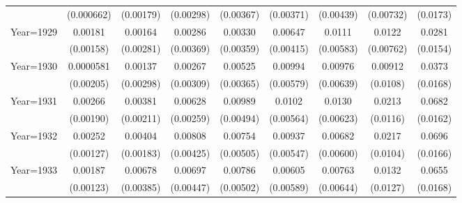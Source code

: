 \begin{table}[htbp]
\begin{tabular}{l*{8}{c}}
                    &  (0.000662)         &   (0.00179)         &   (0.00298)         &   (0.00367)         &   (0.00371)         &   (0.00439)         &   (0.00732)         &    (0.0173)         \\
[1em]
Year=1929           &     0.00181         &     0.00164         &     0.00286         &     0.00330         &     0.00647         &      0.0111\sym{*}  &      0.0122         &      0.0281\sym{*}  \\
                    &   (0.00158)         &   (0.00281)         &   (0.00369)         &   (0.00359)         &   (0.00415)         &   (0.00583)         &   (0.00762)         &    (0.0154)         \\
[1em]
Year=1930           &   0.0000581         &     0.00137         &     0.00267         &     0.00525         &     0.00994\sym{*}  &     0.00976         &     0.00912         &      0.0373\sym{**} \\
                    &   (0.00205)         &   (0.00298)         &   (0.00309)         &   (0.00365)         &   (0.00579)         &   (0.00639)         &    (0.0108)         &    (0.0168)         \\
[1em]
Year=1931           &     0.00266         &     0.00381\sym{*}  &     0.00628\sym{**} &     0.00989\sym{**} &      0.0102\sym{*}  &      0.0130\sym{**} &      0.0213\sym{*}  &      0.0682\sym{***}\\
                    &   (0.00190)         &   (0.00211)         &   (0.00259)         &   (0.00494)         &   (0.00564)         &   (0.00623)         &    (0.0116)         &    (0.0162)         \\
[1em]
Year=1932           &     0.00252\sym{**} &     0.00404\sym{**} &     0.00808\sym{*}  &     0.00754         &     0.00937\sym{*}  &     0.00682         &      0.0217\sym{**} &      0.0696\sym{***}\\
                    &   (0.00127)         &   (0.00183)         &   (0.00425)         &   (0.00505)         &   (0.00547)         &   (0.00600)         &    (0.0104)         &    (0.0166)         \\
[1em]
Year=1933           &     0.00187         &     0.00678\sym{*}  &     0.00697         &     0.00786         &     0.00605         &     0.00763         &      0.0132         &      0.0655\sym{***}\\
                    &   (0.00123)         &   (0.00385)         &   (0.00447)         &   (0.00502)         &   (0.00589)         &   (0.00644)         &    (0.0127)         &    (0.0168)         \\

\end{tabular}
\end{table}
